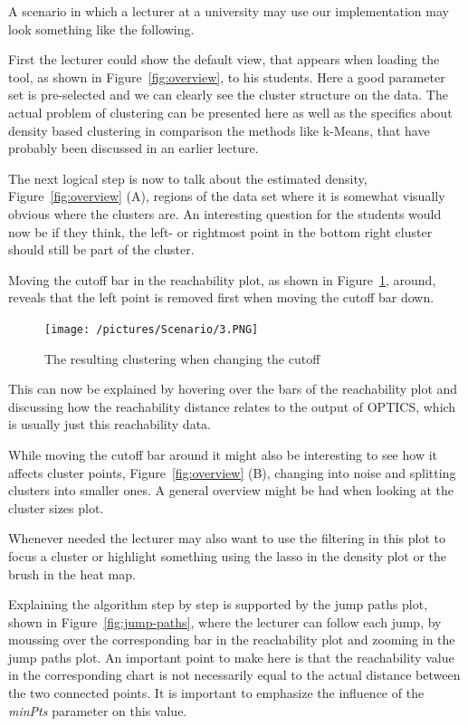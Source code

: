\documentclass{vgtc} %
\begin{document}
A scenario in which a lecturer at a university may use our implementation may
look something like the following.

First the lecturer could show the default view, that appears when loading the
tool, as shown in Figure~\ref{fig:overview}, to his students. Here a good
parameter set is pre-selected and we can clearly see the cluster structure on
the data. The actual problem of clustering can be presented here as well as the
specifics about density based clustering in comparison the methods like
k-Means, that have probably been discussed in an earlier lecture.

The next logical step is now to talk about the estimated density,
Figure~\ref{fig:overview} (A), regions of the data set where it is somewhat
visually obvious where the clusters are. An interesting question for the
students would now be if they think, the left- or rightmost point in the bottom
right cluster should still be part of the cluster.

Moving the cutoff bar in the reachability plot, as shown in
Figure~\ref{fig:reachability-plot}, around, reveals that the left point is
removed first when moving the cutoff bar down.

\begin{figure}[tb]
    \centering
    \texttt{[image: /pictures/Scenario/3.PNG]}
    \caption{The resulting clustering when changing the cutoff}
    \label{fig:reachability-plot}
\end{figure}

This can now be explained by hovering over the bars of the reachability plot
and discussing how the reachability distance relates to the output of OPTICS,
which is usually just this reachability data.

While moving the cutoff bar around it might also be interesting to see how it
affects cluster points, Figure~\ref{fig:overview} (B), changing into noise and
splitting clusters into smaller ones. A general overview might be had when
looking at the cluster sizes plot.

Whenever needed the lecturer may also want to use the filtering in this plot to
focus a cluster or highlight something using the lasso in the density plot
or the brush in the heat map.

Explaining the algorithm step by step is supported by the jump paths plot, shown in
Figure~\ref{fig:jump-paths}, where the lecturer can follow each jump, by
moussing over the corresponding bar in the reachability plot and zooming in the
jump paths plot. An important point to make here is that the reachability value
in the corresponding chart is not necessarily equal to the actual distance
between the two connected points. It is important to emphasize the influence of
the \emph{minPts} parameter on this value.
\end{document}
